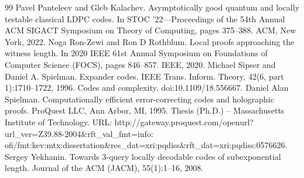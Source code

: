 \documentclass[10pt,a4paper]{article}
\begin{document}
\begin{thebibliography}{99}
 Pavel Panteleev and Gleb Kalachev. Asymptotically good quantum and locally testable classical LDPC codes. In STOC ’22—Proceedings of the 54th Annual ACM SIGACT Symposium on Theory of Computing, pages 375–388. ACM, New York, 2022.
 Noga Ron-Zewi and Ron D Rothblum. Local proofs approaching the witness length. In 2020 IEEE 61st Annual Symposium on Foundations of Computer Science (FOCS), pages 846–857. IEEE, 2020.
 Michael Sipser and Daniel A. Spielman. Expander codes. IEEE Trans. Inform. Theory, 42(6, part 1):1710–1722, 1996. Codes and complexity. doi:10.1109/18.556667.
 Daniel Alan Spielman. Computationally efficient error-correcting codes and holographic proofs. ProQuest LLC, Ann Arbor, MI, 1995. Thesis (Ph.D.) – Massachusetts Institute of Technology. URL: http://gateway.proquest.com/openurl?url\_ver=Z39.88-2004\&rft\_val\_fmt=info: ofi/fmt:kev:mtx:dissertation\&res\_dat=xri:pqdiss\&rft\_dat=xri:pqdiss:0576626.
 Sergey Yekhanin. Towards 3-query locally decodable codes of subexponential length. Journal of the ACM (JACM), 55(1):1–16, 2008.
\end{thebibliography}
\end{document}
